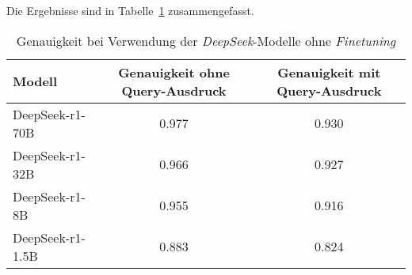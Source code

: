 Die Ergebnisse sind in Tabelle~\ref{tab:deepseek-results} zusammengefasst.
\begin{table}
    \center
    \begin{tabular}{lcc}
        \toprule
        Modell           & Genauigkeit ohne Query-Ausdruck & Genauigkeit mit Query-Ausdruck \\
        \midrule
        DeepSeek-r1-70B  & 0.977                           &  0.930                         \\
        DeepSeek-r1-32B  & 0.966                           &  0.927                         \\
        DeepSeek-r1-8B   & 0.955                           &  0.916                         \\
        DeepSeek-r1-1.5B & 0.883                           &  0.824                         \\
        \bottomrule
    \end{tabular}
    \caption{Genauigkeit bei Verwendung der \textit{DeepSeek}-Modelle ohne \textit{Finetuning}}
    \label{tab:deepseek-results}
\end{table}
